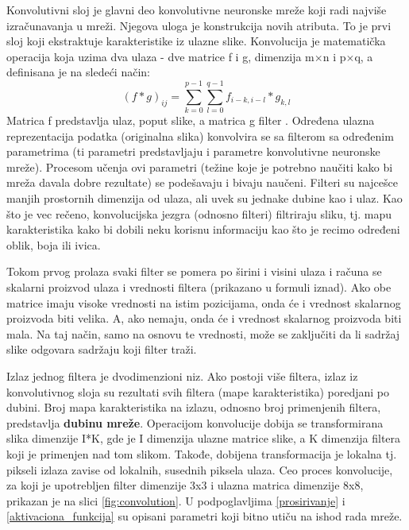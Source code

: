 \documentclass[a4paper]{article}
\begin{document}
Konvolutivni sloj je glavni deo konvolutivne neuronske mreže koji radi najviše izračunavanja u mreži. Njegova uloga je konstrukcija novih atributa. To je prvi sloj koji ekstraktuje karakteristike iz ulazne slike. Konvolucija je matematička operacija koja uzima dva ulaza - dve matrice f i g, dimenzija m$\times$n i p$\times$q, a definisana je na sledeći način:
$$(f * g)_{ij} = \sum_{k=0}^{p-1} \sum_{l=0}^{q-1} f_{i-k, i-l}*g_{k, l}$$
Matrica f predstavlja ulaz, poput slike, a matrica g filter \cite{MLskripta}. Određena ulazna reprezentacija podatka (originalna slika) konvolvira se sa filterom sa određenim parametrima (ti parametri predstavljaju i parametre konvolutivne neuronske mreže). Procesom učenja ovi parametri (težine koje je potrebno naučiti kako bi mreža davala dobre rezultate) se podešavaju i bivaju naučeni. Filteri su najcešce manjih prostornih dimenzija od ulaza, ali uvek su jednake dubine kao i ulaz. Kao što je vec rečeno, konvolucijska jezgra (odnosno filteri) filtriraju sliku, tj. mapu karakteristika kako bi dobili neku korisnu informaciju kao što je recimo određeni oblik, boja ili ivica.

Tokom prvog prolaza svaki filter se pomera po širini i visini ulaza i računa se skalarni proizvod ulaza i vrednosti filtera (prikazano u formuli iznad). Ako obe matrice imaju visoke vrednosti na istim pozicijama, onda će i vrednost skalarnog proizvoda biti velika. A, ako nemaju, onda će i vrednost skalarnog proizvoda biti mala. Na taj način, samo na osnovu te vrednosti, može se zaključiti da li sadržaj slike odgovara sadržaju koji filter traži.

Izlaz jednog filtera je dvodimenzioni niz. Ako postoji više filtera, izlaz iz konvolutivnog sloja su rezultati svih filtera (mape karakteristika) poredjani po dubini. Broj mapa karakteristika na izlazu, odnosno broj primenjenih filtera, predstavlja \textbf{dubinu mreže}. Operacijom konvolucije dobija se transformirana slika dimenzije I*K, gde je I dimenzija ulazne matrice slike, a K dimenzija filtera koji je primenjen nad tom slikom. Takođe, dobijena transformacija je lokalna tj. pikseli izlaza zavise od lokalnih, susednih piksela ulaza. Ceo proces konvolucije, za koji je upotrebljen filter dimenzije 3x3 i ulazna matrica dimenzije 8x8, prikazan je na slici \ref{fig:convolution}. U podpoglavljima \ref{prosirivanje} i \ref{aktivaciona_funkcija} su opisani parametri koji bitno utiču na ishod rada mreže.


\end{document}
